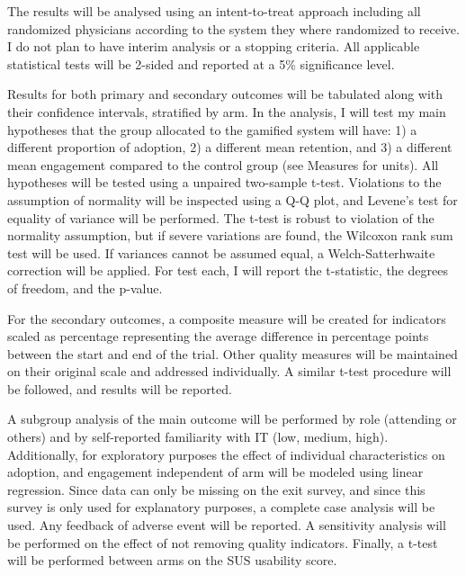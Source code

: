 The results will be analysed using an intent-to-treat approach including all randomized physicians according to the system they where randomized to receive. I do not plan to have interim analysis or a stopping criteria. All applicable statistical tests will be 2-sided and reported at a 5\% significance level.

Results for both primary and secondary outcomes will be tabulated along with their confidence intervals, stratified by arm. In the analysis, I will test my main hypotheses that the group allocated to the gamified system will have: 1) a different proportion of adoption, 2) a different mean retention, and 3) a different mean engagement compared to the control group (see Measures for units). All hypotheses will be tested using a unpaired two-sample t-test. Violations to the assumption of normality will be inspected using a Q-Q plot, and Levene's test for equality of variance will be performed. The t-test is robust to violation of the normality assumption, but if severe variations are found, the Wilcoxon rank sum test will be used. If variances cannot be assumed equal, a Welch-Satterhwaite correction will be applied. For test each, I will report the t-statistic, the degrees of freedom, and the p-value.

For the secondary outcomes, a composite measure will be created for indicators scaled as percentage representing the average difference in percentage points between the start and end of the trial. Other quality measures will be maintained on their original scale and addressed individually. A similar t-test procedure will be followed, and results will be reported.

A subgroup analysis of the main outcome will be performed by role (attending or others) and by self-reported familiarity with IT (low, medium, high). Additionally, for exploratory purposes the effect of individual characteristics on adoption, and engagement independent of arm will be modeled using linear regression. Since data can only be missing on the exit survey, and since this survey is only used for explanatory purposes, a complete case analysis will be used. Any feedback of adverse event will be reported. A sensitivity analysis will be performed on the effect of not removing quality indicators. Finally, a t-test will be performed between arms on the SUS usability score.

